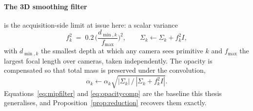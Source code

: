 \paragraph{The 3D smoothing filter} is the acquisition-side limit at issue here:
a scalar variance
\begin{equation}
  f_k^2 \;=\; 0.2\,\Big(\frac{d_{\min,k}}{f_{\max}}\Big)^{\!2},
  \qquad \Sigma_k \leftarrow \Sigma_k + f_k^2 I,
  \label{eq:mipfilter}
\end{equation}
with $d_{\min,k}$ the smallest depth at which any camera sees primitive $k$ and
$f_{\max}$ the largest focal length over cameras, taken independently. The
opacity is compensated so that total mass is preserved under the convolution,
\begin{equation}
  \alpha_k \leftarrow \alpha_k\sqrt{|\Sigma_k| \,/\, |\Sigma_k + f_k^2 I|}.
  \label{eq:opacitycomp}
\end{equation}
Equations~\eqref{eq:mipfilter} and \eqref{eq:opacitycomp} are the baseline this
thesis generalises, and Proposition~\ref{prop:reduction} recovers them exactly.
